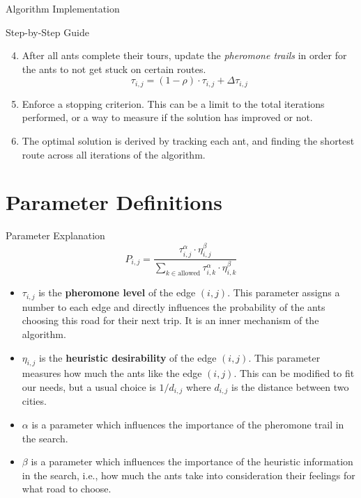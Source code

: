 \documentclass[aspectratio=169,xcolor=dvipsnames, t]{beamer}
\begin{document}
\begin{frame}{Algorithm Implementation}
	\vspace{-5mm}
	\onslide<2->\begin{block}{Step-by-Step Guide}
		\begin{enumerate}
			\setcounter{enumi}{3}
			\item<2-> After all ants complete their tours, update the \textit{pheromone trails} in order for the ants to not get stuck on certain routes.
				\[
					\tau_{i,j} = (1 - \rho) \cdot \tau_{i, j} + \Delta \tau_{i,j} 
				\]
			\item<3-> Enforce a stopping criterion. This can be a limit to the total iterations performed, or a way to measure if the solution has improved or not.
			\item<4-> The optimal solution is derived by tracking each ant, and finding the shortest route across all iterations of the algorithm.
		\end{enumerate}
	\end{block}
\end{frame}

\section{Parameter Definitions}
\begin{frame}{Parameter Explanation}
	\vspace{-10mm}
	\[
		P_{i,j} = \frac{\tau_{i,j}^{\alpha} \cdot \eta_{i,j}^{\beta}}{\sum_{k \in \text{allowed}} \tau_{i,k}^{\alpha} \cdot \eta_{i,k}^{\beta}}
	\]
	\begin{itemize}
		\item<2-> \( \tau_{i,j} \) is the \textbf{pheromone level} of the edge \( (i,j) \). This parameter assigns a number to each edge and directly influences the probability of the ants choosing this road for their next trip. It is an inner mechanism of the algorithm.
		\item<3-> \( \eta_{i,j} \) is the \textbf{heuristic desirability} of the edge \( (i,j) \). This parameter measures how much the ants like the edge \( (i, j) \). This can be modified to fit our needs, but a usual choice is \( 1 / d_{i,j} \) where \(d_{i,j}\) is the distance between two cities.
		\item<4-> \( \alpha \) is a parameter which influences the importance of the pheromone trail in the search.
		\item<5-> \( \beta \) is a parameter which influences the importance of the heuristic information in the search, i.e., how much the ants take into consideration their feelings for what road to choose.
	\end{itemize}
\end{frame}
\end{document}
